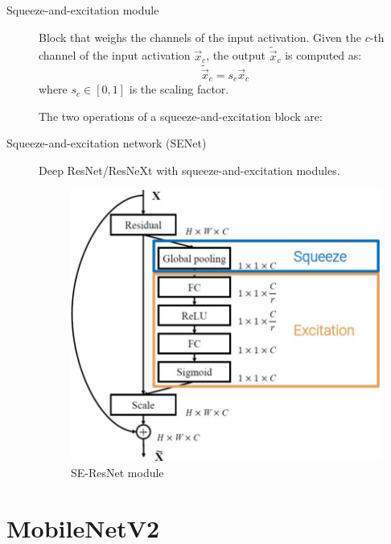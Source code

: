 \begin{description}
    \item[Squeeze-and-excitation module] 
        Block that weighs the channels of the input activation.
        Given the $c$-th channel of the input activation $\vec{x}_c$, the output $\tilde{\vec{x}}_c$ is computed as:
        \[ \tilde{\vec{x}}_c = s_c \vec{x}_c \]
        where $s_c \in [0, 1]$ is the scaling factor.

        The two operations of a squeeze-and-excitation block are:


    \item[Squeeze-and-excitation network (SENet)]
        Deep ResNet/ResNeXt with squeeze-and-excitation modules.

        \begin{figure}[H]
            \centering
            \includegraphics[width=0.4\linewidth]{./img/se_resnet.jpg}
            \caption{SE-ResNet module}
        \end{figure}
\end{description}



\section{MobileNetV2}


